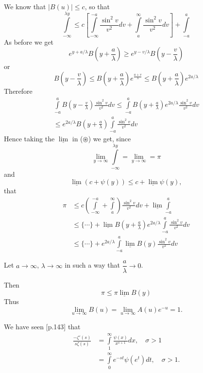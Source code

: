 We know that $|B(u)| \leq c$, so that
$$
\int\limits^{\lambda y}_{-\infty} \leq c
\left[\int\limits^{-a}_{-\infty} \frac{\sin^2v}{v^2} dv +
  \int\limits^\infty_a \frac{\sin^2 v}{v^2} dv\right]  +
\int\limits^a_{-a} 
$$
As before we get
$$
e^{y+a/\lambda} B \left(y + \frac{a}{\lambda} \right) \geq e^{y-v/\lambda} B \left(y
-\frac{v}{\lambda} \right) 
$$
or
$$
B \left(y-\frac{v}{\lambda} \right) \leq B \left(y + \frac{a}{\lambda} \right)
e^{\frac{a+v}{\lambda}} \leq B \left(y + \frac{a}{\lambda} \right) e^{2a/\lambda} 
$$
Therefore 
\begin{gather*}
\int\limits^a_{-a} B \left(y - \frac{v}{\lambda} \right) \frac{\sin^2 v}{v^2} dv
\leq \int\limits^a_{-a} B \left(y + \frac{a}{\lambda} \right) e^{2a/\lambda}
\frac{\sin^2 v}{v^2} dv\\
\leq e^{2a/\lambda} B \left(y + \frac{a}{\lambda} \right) \int\limits^a_{-a}
\frac{\sin^2 v}{v^2} dv
\end{gather*}\pageoriginale
Hence taking the $\underline{\lim}$ in ($\circledast$) we get, since
$$ 
\lim\limits_{y \to \infty} \int\limits^{\lambda y}_{-\infty} = \lim\limits_{y
  \to \infty} = \pi
$$
and
$$
\underline{\lim} (c+\psi(y)) \leq c + \underline{\lim} \psi(y), 
$$
that
\begin{align*}
\pi & \leq c \left(\int\limits^{-a}_{-\infty} +
\int\limits^{\infty}_{a} \right) \frac{\sin^2 v}{v^2} dv +
\underline{\lim} \int\limits^a_{-a}  \\
& \leq \{\cdots\} + \underline{\lim} B \left(y+\frac{a}{\lambda} \right)
e^{2a/\lambda} \int\limits^a_{-a} \frac{\sin^2v}{v^2} dv\\
& \leq \{\cdots\} + e^{2a/\lambda} \int\limits^a_{-a} \underline{\lim}
B(y) \frac{\sin^2 v}{v^2} dv
\end{align*}

Let $a \to \infty$, $\lambda \to \infty$ in such a way that
$\dfrac{a}{\lambda} \to 0$. 

Then 
$$
\pi \leq \pi \underline{\lim} B(y)
$$
Thus
$$
\lim\limits_{u\to\infty} B(u) = \lim\limits_{u\to \infty} A(u) e^{-u}
=1. 
$$

\medskip
{}\pageoriginale

We have seen [p.143] that 
\begin{align*}
\frac{-\zeta'(s)}{s\zeta(s)} & = \int\limits^{\infty}_1
\frac{\psi(x)}{x^{s+1}} dx, \quad \sigma >1\\
& = \int\limits^{\infty}_0 e^{-st} \psi (e^t) dt, \quad \sigma > 1.
\end{align*}

